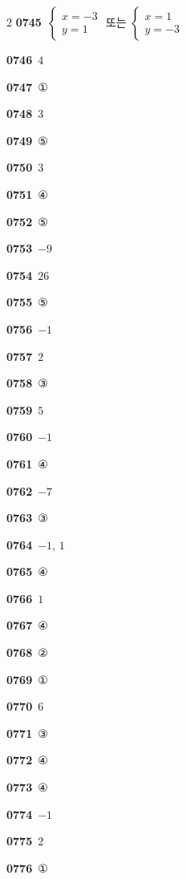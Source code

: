 \documentclass[10pt,a4paper]{article}
\begin{document}
\begin{multicols}{2}
\noindent\textbf{0745}\ $\begin{cases} x=-3 \\ y=1 \end{cases}$ 또는 $\begin{cases} x=1 \\ y=-3 \end{cases}$\par
\noindent\textbf{0746}\ $4$\par
\noindent\textbf{0747}\ ①\par
\noindent\textbf{0748}\ $3$\par
\noindent\textbf{0749}\ ⑤\par
\noindent\textbf{0750}\ $3$\par
\noindent\textbf{0751}\ ④\par
\noindent\textbf{0752}\ ⑤\par
\noindent\textbf{0753}\ $-9$\par
\noindent\textbf{0754}\ $26$\par
\noindent\textbf{0755}\ ⑤\par
\noindent\textbf{0756}\ $-1$\par
\noindent\textbf{0757}\ $2$\par
\noindent\textbf{0758}\ ③\par
\noindent\textbf{0759}\ $5$\par
\noindent\textbf{0760}\ $-1$\par
\noindent\textbf{0761}\ ④\par
\noindent\textbf{0762}\ $-7$\par
\noindent\textbf{0763}\ ③\par
\noindent\textbf{0764}\ $-1$, $1$\par
\noindent\textbf{0765}\ ④\par
\noindent\textbf{0766}\ $1$\par
\noindent\textbf{0767}\ ④\par
\noindent\textbf{0768}\ ②\par
\noindent\textbf{0769}\ ①\par
\noindent\textbf{0770}\ $6$\par
\noindent\textbf{0771}\ ③\par
\noindent\textbf{0772}\ ④\par
\noindent\textbf{0773}\ ④\par
\noindent\textbf{0774}\ $-1$\par
\noindent\textbf{0775}\ $2$\par
\noindent\textbf{0776}\ ①\par

\end{multicols}
\end{document}

